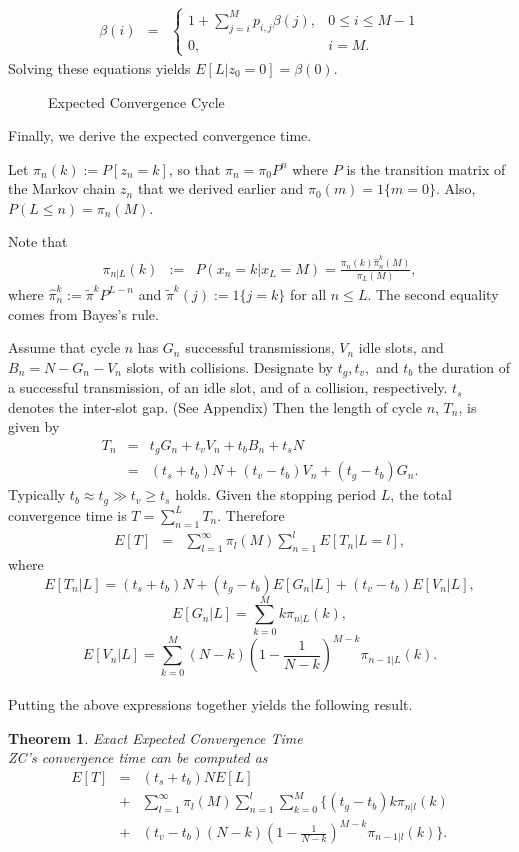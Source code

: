 \documentclass{acm_proc_article-sp}
\newtheorem{theorem}{Theorem}
\newcommand{\be}{\begin{eqnarray}}
\newcommand{\ee}{\end{eqnarray}}
\newcommand{\sub}{}
\begin{document}
\be
\label{beta1}
\beta(i) &=&\left\{
\begin{array}{ll}
1 + \sum_{j=i}^{M}p_{i,j}\beta(j), & 0 \leq i \leq M-1\\
0, & i=M.
\end{array}\right.
\ee
Solving these equations yields $E[L | z_0 = 0] = \beta (0)$.
\begin{figure}
   \begin{center}
   \caption{Expected Convergence Cycle}
   \label{fig.barking}
   \end{center}
\vspace{-0.2in}
\end{figure}


Finally, we derive the expected convergence time.

Let $\pi_n (k) := P[z_n = k]$, so that $\pi_n = \pi_0 P^n$ where $P$ is the transition matrix of the Markov chain $z_n$ that we derived earlier and $\pi_0 (m) = 1\{m = 0\}$.  Also, $P(L \leq n) = \pi_n (M)$.



Note that
\be
\pi_{n|L}(k) &:=& P(x_n = k|x_L = M) = \frac{\pi_n(k) \hat{\pi}^k_n(M)}{\pi_L(M)},
\ee
where $\hat{\pi}^k_n := \tilde{\pi}^k P^{L-n}$ and $\tilde{\pi}^k(j) := 1\{j=k\}$ for all $n \leq L$. The second equality comes from Bayes's rule.

Assume that cycle $n$ has $G_n$ successful transmissions, $V_n$ idle slots, and $B_n = N - G_n - V_n$ slots with collisions.  Designate by $t_g, t_v,$ and $t_b$ the duration of a successful transmission, of an idle slot, and of a collision, respectively. $t_s$ denotes the inter-slot gap. (See Appendix) Then
the length of cycle $n$, $T_n$, is given by
\be T_n &=& t_g G_n + t_v V_n + t_b B_n + t_s N \\
&=& (t_s + t_b)N + (t_v - t_b)V_n + (t_g - t_b)G_n . \sub\ee
Typically $t_b \approx t_g \gg t_v \geq t_s$ holds. Given the stopping period $L$, the total convergence time is $T = \sum_{n=1}^{L} T_n$. Therefore
\be \label{periodlength} E[T] &=& \sum_{l=1}^{\infty} \pi_l(M) \sum_{n=1}^{l} E[T_n|L=l],\ee
where
\[E[T_n|L] = (t_s + t_b)N + (t_g - t_b)E[G_n|L] + (t_v - t_b)E[V_n|L], \]
\[E[G_n|L] = \sum_{k=0}^{M} k \pi_{n|L}(k),\]
\[E[V_n|L] = \sum_{k=0}^{M} (N-k)(1-\frac{1}{N-k})^{M-k} \pi_{n-1|L}(k).\]\\
Putting the above expressions together yields the following result.

\begin{theorem}{Exact Expected Convergence Time}\\
ZC's convergence time can be computed as
\begin{eqnarray*}
E[T] &=& (t_s + t_b)N E[L]\\
&+& \sum_{l=1}^{\infty} \pi_{l}(M) \sum_{n=1}^{l} \sum_{k=0}^{M}\{ (t_g - t_b) k \pi_{n|l}(k) \\
&+& (t_v - t_b) (N-k)(1-\frac{1}{N-k})^{M-k} \pi_{n-1|l}(k)\}.
\end{eqnarray*}
\end{theorem}
\end{document}
